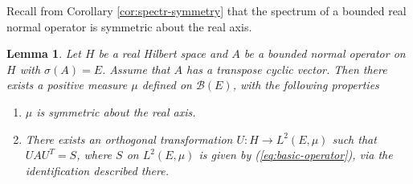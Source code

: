 \documentclass[12pt,a4paper,twoside]{article}
\numberwithin{equation}{section}
\theoremstyle{definition}  %
\theoremstyle{plain}  %
\newtheorem{lem}[defn]{Lemma}
\theoremstyle{remark} %
\begin{document}
Recall from Corollary \ref{cor:spectr-symmetry} that the spectrum of a bounded real normal operator is symmetric about the real axis.
\begin{lem}\label{lem:spectr-theor-real}
Let $H$ be  a real Hilbert space and $A$ be a bounded normal operator on $H$ with $\sigma(A) = E$. Assume that $A$ has a transpose cyclic vector.  Then there exists a positive measure $\mu$ defined on $\mathcal{B}(E)$, with the following properties
\begin{enumerate}[label=\roman*)]
\item\label{item:1} $\mu$ is symmetric about the real axis.
\item \label{item:2}There exists  an orthogonal transformation $U \colon H \rightarrow  L^{2}(E,\mu)$ such that $U A U^{T} = S$, where $S$ on $L^2(E,\mu) $ is given by (\ref{eq:basic-operator}), via the identification described there.
\end{enumerate}
\end{lem}
\end{document}
